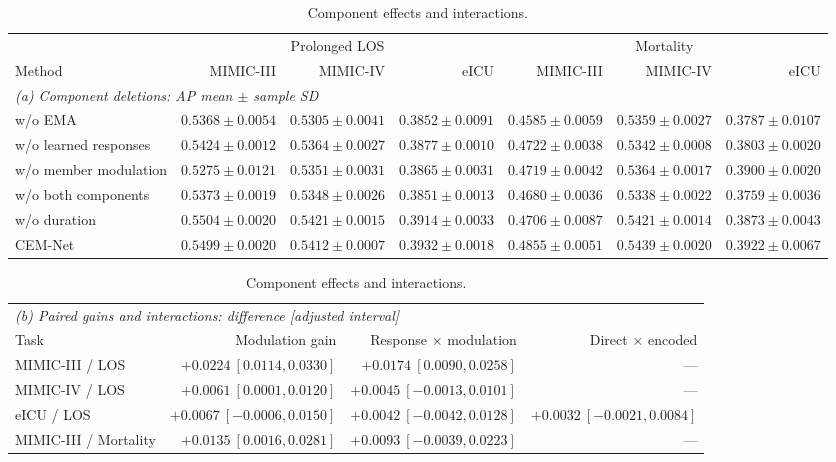 \begin{table}[tp]
\centering\small
\setlength{\tabcolsep}{1.6pt}
\caption{Component effects and interactions.}
\label{tab:ablation}\label{tab:interaction}
\begin{tabular}{lrrrrrr}
\toprule
& \multicolumn{3}{c}{Prolonged LOS} & \multicolumn{3}{c}{Mortality} \\
\cmidrule(lr){2-4}\cmidrule(lr){5-7}
Method & MIMIC-III & MIMIC-IV & eICU & MIMIC-III & MIMIC-IV & eICU \\
\midrule
\multicolumn{7}{l}{\textit{(a) Component deletions: AP mean $\pm$ sample SD}} \\
w/o EMA & $0.5368\pm0.0054$ & $0.5305\pm0.0041$ & $0.3852\pm0.0091$ & $0.4585\pm0.0059$ & $0.5359\pm0.0027$ & $0.3787\pm0.0107$ \\
w/o learned responses & $0.5424\pm0.0012$ & $0.5364\pm0.0027$ & $0.3877\pm0.0010$ & $0.4722\pm0.0038$ & $0.5342\pm0.0008$ & $0.3803\pm0.0020$ \\
w/o member modulation & $0.5275\pm0.0121$ & $0.5351\pm0.0031$ & $0.3865\pm0.0031$ & $0.4719\pm0.0042$ & $0.5364\pm0.0017$ & $0.3900\pm0.0020$ \\
w/o both components & $0.5373\pm0.0019$ & $0.5348\pm0.0026$ & $0.3851\pm0.0013$ & $0.4680\pm0.0036$ & $0.5338\pm0.0022$ & $0.3759\pm0.0036$ \\
w/o duration & $0.5504\pm0.0020$ & $0.5421\pm0.0015$ & $0.3914\pm0.0033$ & $0.4706\pm0.0087$ & $0.5421\pm0.0014$ & $0.3873\pm0.0043$ \\
CEM-Net & $0.5499\pm0.0020$ & $0.5412\pm0.0007$ & $0.3932\pm0.0018$ & $0.4855\pm0.0051$ & $0.5439\pm0.0020$ & $0.3922\pm0.0067$ \\
\bottomrule
\end{tabular}
\par
\setlength{\tabcolsep}{4pt}
\begin{tabular}{@{}lrrr@{}}
\multicolumn{4}{l}{\textit{(b) Paired gains and interactions: difference [adjusted interval]}} \\
Task & Modulation gain & Response $\times$ modulation & Direct $\times$ encoded \\
\midrule
MIMIC-III / LOS & $+0.0224\ [0.0114,0.0330]$ & $+0.0174\ [0.0090,0.0258]$ & --- \\
MIMIC-IV / LOS & $+0.0061\ [0.0001,0.0120]$ & $+0.0045\ [-0.0013,0.0101]$ & --- \\
eICU / LOS & $+0.0067\ [-0.0006,0.0150]$ & $+0.0042\ [-0.0042,0.0128]$ & $+0.0032\ [-0.0021,0.0084]$ \\
MIMIC-III / Mortality & $+0.0135\ [0.0016,0.0281]$ & $+0.0093\ [-0.0039,0.0223]$ & --- \\

\end{tabular}
\end{table}
